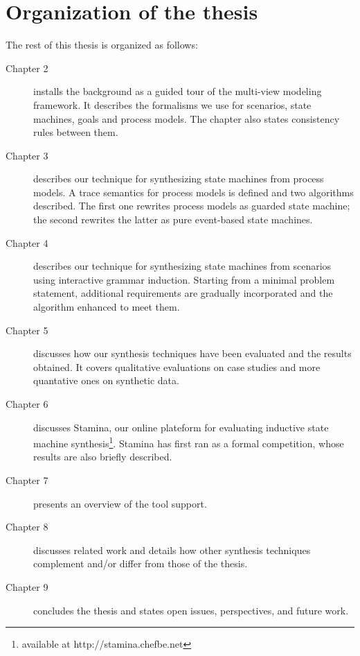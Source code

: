 \section{Organization of the thesis\label{section:intro-organization}}

The rest of this thesis is organized as follows:

\begin{description}

\item[Chapter 2] installs the background as a guided tour of the multi-view modeling framework. It describes the formalisms we use for scenarios, state machines, goals and process models. The chapter also states consistency rules between them.

\item[Chapter 3] describes our technique for synthesizing state machines from process models. A trace semantics for process models is defined and two algorithms described. The first one rewrites process models as guarded state machine; the second rewrites the latter as pure event-based state machines.

\item[Chapter 4] describes our technique for synthesizing state machines from scenarios using interactive grammar induction. Starting from a minimal problem statement, additional requirements are gradually incorporated and the algorithm enhanced to meet them.

\item[Chapter 5] discusses how our synthesis techniques have been evaluated and the results obtained. It covers qualitative evaluations on case studies and more quantative ones on synthetic data.

\item[Chapter 6] discusses Stamina, our online plateform for evaluating inductive state machine synthesis\footnote{available at http://stamina.chefbe.net}. Stamina has first ran as a formal competition, whose results are also briefly described.

\item[Chapter 7] presents an overview of the tool support.

\item[Chapter 8] discusses related work and details how other synthesis techniques complement and/or differ from those of the thesis.

\item[Chapter 9] concludes the thesis and states open issues, perspectives, and future work. 

\end{description}

